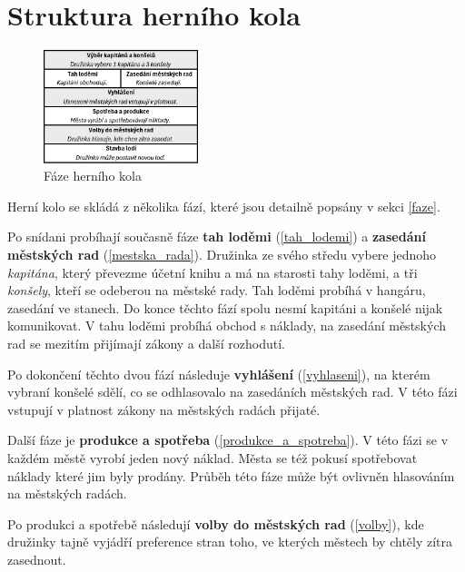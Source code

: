 \documentclass[a4paper, 12pt, twoside]{article}
\begin{document}
\newpage

\section{Struktura herního kola}


\begin{figure}
\vspace{-0.7cm}
\centering
\includegraphics[width=0.4\textwidth]{figs/structaid.pdf}
\vspace{-0.7cm}
\caption{Fáze herního kola}
\label{structaid}
\end{figure}

Herní kolo se skládá z několika fází, které jsou detailně popsány v sekci \ref{faze}.

Po snídani probíhají současně fáze \textbf{tah loděmi} (\ref{tah_lodemi}) a \textbf{zasedání městských rad} (\ref{mestska_rada}).  
Družinka ze svého středu vybere jednoho \emph{kapitána}, který převezme účetní knihu a má na starosti tahy loděmi, a tři \emph{konšely}, kteří 
se odeberou na městské rady.
Tah loděmi probíhá v hangáru, zasedání ve stanech.  
Do konce těchto fází spolu nesmí kapitáni a konšelé nijak komunikovat. 
V tahu loděmi probíhá obchod s náklady, na zasedání městských rad se mezitím přijímají zákony a další rozhodutí.

Po dokončení těchto dvou fází následuje \textbf{vyhlášení} (\ref{vyhlaseni}), na kterém vybraní konšelé sdělí, co se odhlasovalo na zasedáních městských rad.  V této fázi
vstupují v platnost zákony na městských radách přijaté.

Další fáze je \textbf{produkce a spotřeba} (\ref{produkce_a_spotreba}).
V této fázi se v každém městě vyrobí jeden nový náklad.  Města se též pokusí spotřebovat náklady které jim byly prodány.  Průběh této fáze může být ovlivněn 
hlasováním na městských radách.

Po produkci a spotřebě následují \textbf{volby do městských rad} (\ref{volby}), kde družinky tajně vyjádří preference stran toho, ve kterých 
městech by chtěly zítra zasednout.  
\end{document}

